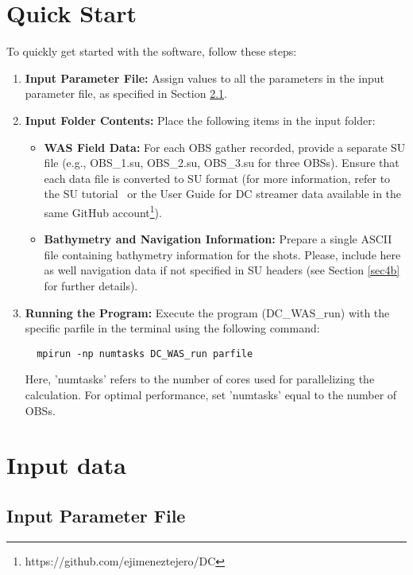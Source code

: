 \documentclass[11pt, oneside]{article}   	%
\begin{document}
\section{Quick Start}\label{sec3}

To quickly get started with the software, follow these steps:

\begin{enumerate}
  \item \textbf{Input Parameter File:} Assign values to all the parameters in the input parameter file, as specified in Section \ref{sec4a}.

  \item \textbf{Input Folder Contents:} Place the following items in the input folder:
    \begin{itemize}
      \item \textbf{WAS Field Data:} For each OBS gather recorded, provide a separate SU file (e.g., OBS\_1.su, OBS\_2.su, OBS\_3.su for three OBSs). Ensure that each data file is converted to SU format (for more information, refer to the SU tutorial~\cite{SU} or the User Guide for DC streamer data available in the same GitHub account\footnote{https://github.com/ejimeneztejero/DC}).

      \item \textbf{Bathymetry and Navigation Information:} Prepare a single ASCII file containing bathymetry information for the shots. Please, include here as well navigation data if not specified in SU headers (see Section \ref{sec4b} for further details).
    \end{itemize}

  \item \textbf{Running the Program:} Execute the program (DC\_WAS\_run) with the specific parfile in the terminal using the following command:
  \begin{verbatim}
  mpirun -np numtasks DC_WAS_run parfile
  \end{verbatim}
  Here, 'numtasks' refers to the number of cores used for parallelizing the calculation. For optimal performance, set 'numtasks' equal to the number of OBSs.

\end{enumerate}

\section{Input data}\label{sec4}

\subsection{Input Parameter File}\label{sec4a}
\end{document}
